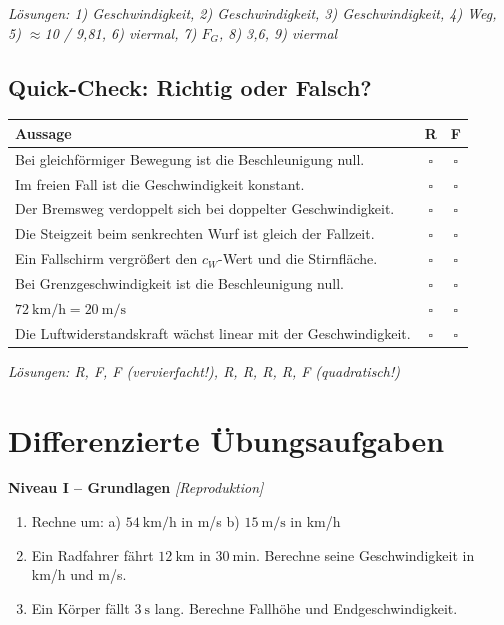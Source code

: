 \documentclass[11pt, a4paper]{article}
\begin{document}
\textit{Lösungen: 1) Geschwindigkeit, 2) Geschwindigkeit, 3) Geschwindigkeit, 4) Weg, 5) $\approx$10 / 9,81, 6) viermal, 7) $F_G$, 8) 3,6, 9) viermal}

\subsection{Quick-Check: Richtig oder Falsch?}

\begin{center}
\begin{tabular}{|p{10cm}|c|c|}
\hline
\textbf{Aussage} & \textbf{R} & \textbf{F} \\
\hline
Bei gleichförmiger Bewegung ist die Beschleunigung null. & $\square$ & $\square$ \\
\hline
Im freien Fall ist die Geschwindigkeit konstant. & $\square$ & $\square$ \\
\hline
Der Bremsweg verdoppelt sich bei doppelter Geschwindigkeit. & $\square$ & $\square$ \\
\hline
Die Steigzeit beim senkrechten Wurf ist gleich der Fallzeit. & $\square$ & $\square$ \\
\hline
Ein Fallschirm vergrößert den $c_W$-Wert und die Stirnfläche. & $\square$ & $\square$ \\
\hline
Bei Grenzgeschwindigkeit ist die Beschleunigung null. & $\square$ & $\square$ \\
\hline
$\SI{72}{\kilo\metre\per\hour} = \SI{20}{\metre\per\second}$ & $\square$ & $\square$ \\
\hline
Die Luftwiderstandskraft wächst linear mit der Geschwindigkeit. & $\square$ & $\square$ \\
\hline
\end{tabular}
\end{center}

\textit{Lösungen: R, F, F (vervierfacht!), R, R, R, R, F (quadratisch!)}

\newpage


\section{Differenzierte Übungsaufgaben}

\textbf{Niveau I -- Grundlagen} \hfill \textit{[Reproduktion]}

\begin{enumerate}
    \item Rechne um: a) $\SI{54}{\kilo\metre\per\hour}$ in m/s \hspace{1cm} b) $\SI{15}{\metre\per\second}$ in km/h

    \item Ein Radfahrer fährt $\SI{12}{\kilo\metre}$ in $\SI{30}{\minute}$. Berechne seine Geschwindigkeit in km/h und m/s.

    \item Ein Körper fällt $\SI{3}{\second}$ lang. Berechne Fallhöhe und Endgeschwindigkeit.
\end{enumerate}
\end{document}
